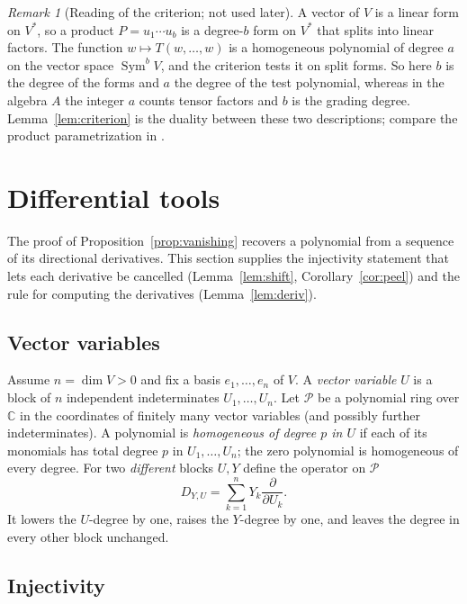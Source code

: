 \documentclass[11pt]{article}
\theoremstyle{remark}
\newtheorem{remark}[theorem]{Remark}
\DeclareMathOperator{\Sym}{Sym}
\newcommand{\C}{\mathbb C}
\newcommand{\D}[2]{D_{#1,#2}}
\newcommand{\PP}{\mathcal P}
\begin{document}
\begin{remark}[Reading of the criterion; not used later]\label{rem:reading}
A vector of $V$ is a linear form on $V^*$, so a product $P=u_1\cdots u_b$
is a degree-$b$ form on $V^*$ that splits into linear factors. The function
$w\mapsto T(w,\dots,w)$ is a homogeneous polynomial of degree $a$ on the
vector space $\Sym^bV$, and the criterion tests it on split forms. So here
$b$ is the degree of the forms and $a$ the degree of the test polynomial,
whereas in the algebra $A$ the integer $a$ counts tensor factors and $b$ is
the grading degree. Lemma~\ref{lem:criterion} is the duality between these
two descriptions; compare the product parametrization in
\cite[Section~2]{RSW}.
\end{remark}

\section{Differential tools}\label{sec:differential}

The proof of Proposition~\ref{prop:vanishing} recovers a polynomial from a
sequence of its directional derivatives. This section supplies the
injectivity statement that lets each derivative be cancelled
(Lemma~\ref{lem:shift}, Corollary~\ref{cor:peel}) and the rule for
computing the derivatives (Lemma~\ref{lem:deriv}).

\subsection{Vector variables}

Assume $n=\dim V>0$ and fix a basis $e_1,\dots,e_n$ of $V$. A \emph{vector
variable} $U$ is a block of $n$ independent indeterminates
$U_1,\ldots,U_n$. Let $\PP$ be a polynomial ring over $\C$ in the
coordinates of finitely many vector variables (and possibly further
indeterminates). A polynomial is \emph{homogeneous of degree $p$ in $U$} if
each of its monomials has total degree $p$ in $U_1,\dots,U_n$; the zero
polynomial is homogeneous of every degree. For two \emph{different} blocks
$U,Y$ define the operator on $\PP$
\[
 \D{Y}{U}=\sum_{k=1}^n Y_k\frac{\partial}{\partial U_k}.
\]
It lowers the $U$-degree by one, raises the $Y$-degree by one, and leaves
the degree in every other block unchanged.

\subsection{Injectivity}
\end{document}
